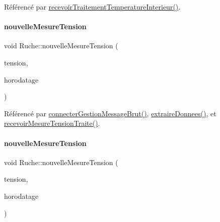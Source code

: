 Référencé par \hyperlink{class_ruche_a2d2a681916140b977d45423d0d5d7b34}{recevoir\+Traitement\+Temperature\+Interieur()}.

\mbox{\label{class_ruche_aa3fd352b343fcf780787aeb7e42935ef}} 
\paragraph{\texorpdfstring{nouvelle\+Mesure\+Tension}{nouvelleMesureTension}\hspace{0.1cm}{\footnotesize\ttfamily [1/2]}}
{\footnotesize\ttfamily void Ruche\+::nouvelle\+Mesure\+Tension (\begin{DoxyParamCaption}\item[{Q\+String}]{tension,  }\item[{Q\+String}]{horodatage }\end{DoxyParamCaption})\hspace{0.3cm}{\ttfamily [signal]}}



Référencé par \hyperlink{class_ruche_a9c8e7e3b529676c6dda3d936370af00f}{connecter\+Gestion\+Message\+Brut()}, \hyperlink{class_ruche_a21c0dafeaec03d451590037343e6a3ca}{extraire\+Donnees()}, et \hyperlink{class_ruche_a65782ea2ee63003f2eae45e2530e3d5b}{recevoir\+Mesure\+Tension\+Traite()}.

\mbox{\label{class_ruche_abe4e46c9a1b6e8cfb6adb2e958d9ab83}} 
\paragraph{\texorpdfstring{nouvelle\+Mesure\+Tension}{nouvelleMesureTension}\hspace{0.1cm}{\footnotesize\ttfamily [2/2]}}
{\footnotesize\ttfamily void Ruche\+::nouvelle\+Mesure\+Tension (\begin{DoxyParamCaption}\item[{double}]{tension,  }\item[{Q\+String}]{horodatage }\end{DoxyParamCaption})\hspace{0.3cm}{\ttfamily [signal]}}

